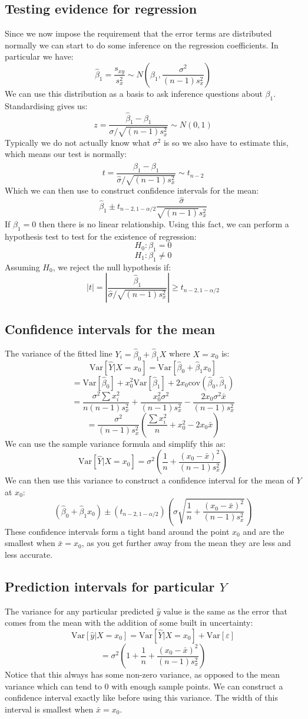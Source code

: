 \documentclass[12pt]{article}
\newcommand{\Var}[1]{\text{Var}[#1]}
\begin{document}
\subsection*{Testing evidence for regression}
Since we now impose the requirement that the error terms are distributed normally we can start to do some inference on the regression coefficients. In particular we have:
\[\hat{\beta}_1=\frac{s_{xy}}{s_x^2}\sim N\left(\beta_1,\frac{\sigma^2}{(n-1)s_x^2}\right)\]
We can use this distribution as a basis to ask inference questions about \(\beta_1\). Standardising gives us:
\[z=\frac{\hat{\beta}_1-\beta_1}{\sigma/\sqrt{(n-1)s_x^2}}\sim N(0,1)\]
Typically we do not actually know what \(\sigma^2\) is so we also have to estimate this, which means our test is normally:
\[t=\frac{\hat{\beta}_1-\beta_1}{\hat{\sigma}/\sqrt{(n-1)s_x^2}}\sim t_{n-2}\]
Which we can then use to construct confidence intervals for the mean:
\[\hat{\beta}_1\pm t_{n-2,1-\alpha/2}\frac{\hat{\sigma}}{\sqrt{(n-1)}s_x^2}\]
If \(\beta_1=0\) then there is no linear relationship. Using this fact, we can perform a hypothesis test to test for the existence of regression:
\[H_0\!: \beta_1=0\]
\[H_1\!: \beta_1\ne 0\]
Assuming \(H_0\), we reject the null hypothesis if:
\[|t|=\left|\frac{\hat{\beta}_1}{\hat{\sigma}/\sqrt{(n-1)s_x^2}}\right|\geq t_{n-2,1-\alpha/2}\]
\subsection*{Confidence intervals for the mean}
The variance of the fitted line \(Y_i=\hat{\beta}_0+\hat{\beta}_1X\) where \(X=x_0\) is:
\[\Var{\hat{Y}|X=x_0}=\Var{\hat{\beta}_0+\hat{\beta}_1x_0}\]
\[=\Var{\hat{\beta}_0}+x_0^2\Var{\hat{\beta}_1}+2x_0\text{cov}(\hat{\beta}_0,\hat{\beta}_1)\]
\[=\frac{\sigma^2\sum x_i^2}{n(n-1)s_x^2}+\frac{x_0^2\sigma^2}{(n-1)s_x^2}-\frac{2x_0\sigma^2\bar{x}}{(n-1)s_x^2}\]
\[=\frac{\sigma^2}{(n-1)s_x^2}\left(\frac{\sum x_i^2}{n}+x_0^2-2x_0\bar{x}\right)\]
We can use the sample variance formula and simplify this as:
\[\Var{\hat{Y}|X=x_0}=\sigma^2\left(\frac{1}{n}+\frac{(x_0-\bar{x})^2}{(n-1)s_x^2}\right)\]
We can then use this variance to construct a confidence interval for the mean of \(Y\) at \(x_0\):
\[(\hat{\beta}_0+\hat{\beta}_1x_0)\pm(t_{n-2,1-\alpha/2})\left(\hat{\sigma}\sqrt{\frac{1}{n}+\frac{(x_0-\bar{x})^2}{(n-1)s_x^2}}\right)\]
These confidence intervals form a tight band around the point \(x_0\) and are the smallest when \(\bar{x}=x_0\), as you get further away from the mean they are less and less accurate.
\subsection*{Prediction intervals for particular \(Y\)}
The variance for any particular predicted \(\hat{y}\) value is the same as the error that comes from the mean with the addition of some built in uncertainty:
\[\Var{\hat{y}|X=x_0}=\Var{\hat{Y}|X=x_0}+\Var{\varepsilon}\]
\[=\sigma^2\left(1+\frac{1}{n}+\frac{(x_0-\bar{x})^2}{(n-1)s_x^2}\right)\]
Notice that this always has some non-zero variance, as opposed to the mean variance which can tend to \(0\) with enough sample points. We can construct a confidence interval exactly like before using this variance. The width of this interval is smallest when \(\bar{x}=x_0\).
\end{document}
